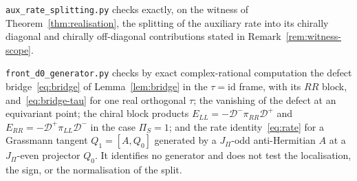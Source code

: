 \documentclass[11pt]{article}
\theoremstyle{definition}
\theoremstyle{remark}
\newcommand{\JPi}{J_{\Pi}}
\newcommand{\PiS}{\Pi_{S}}
\newcommand{\Deff}{\mathcal{D}}
\begin{document}
    \texttt{aux\_rate\_splitting.py} checks exactly, on the witness of Theorem~\ref{thm:realisation}, the splitting of
    the auxiliary rate into its chirally diagonal and chirally off-diagonal contributions stated in
    Remark~\ref{rem:witness-scope}.

    \texttt{front\_d0\_generator.py} checks by exact complex-rational computation the defect bridge~\eqref{eq:bridge} of
    Lemma~\ref{lem:bridge} in the $\tau = \mathrm{id}$ frame, with its $RR$ block, and~\eqref{eq:bridge-tau} for one
    real
    orthogonal $\tau$; the vanishing of the defect at an equivariant point; the chiral block products
    $E_{LL} = -\Deff^{-} \pi_{RR} \Deff^{+}$ and $E_{RR} = -\Deff^{+} \pi_{LL} \Deff^{-}$ in the case $\PiS = 1$; and
    the
    rate identity~\eqref{eq:rate} for a Grassmann tangent $Q_1 = [A, Q_0]$ generated by a $\JPi$-odd anti-Hermitian $A$
    at a $\JPi$-even projector $Q_0$.
    It identifies no generator and does not test the localisation, the sign, or the normalisation of the split.

  \newpage

  
  
\end{document}
